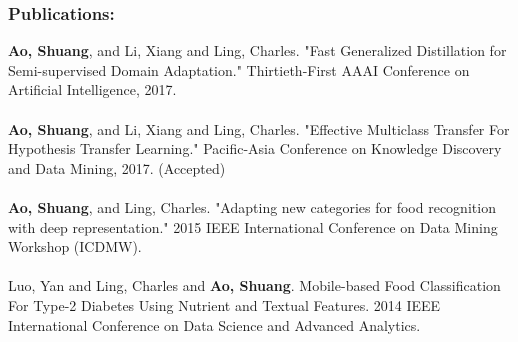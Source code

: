 \documentclass[12pt,twoside]{report}
\numberwithin{figure}{chapter}
\begin{document}
	\subsubsection*{Publications:}
	\textbf{Ao, Shuang}, and Li, Xiang and Ling, Charles. "Fast Generalized Distillation for Semi-supervised Domain Adaptation." Thirtieth-First AAAI Conference on Artificial Intelligence, 2017.\\\\
	\textbf{Ao, Shuang}, and Li, Xiang and Ling, Charles. "Effective Multiclass Transfer For Hypothesis Transfer Learning." Pacific-Asia Conference on Knowledge Discovery and Data Mining, 2017. (Accepted)\\\\
	\textbf{Ao, Shuang}, and Ling, Charles. "Adapting new categories for food recognition with deep representation." 2015 IEEE International Conference on Data Mining Workshop (ICDMW).\\\\
	Luo, Yan and Ling, Charles and \textbf{Ao, Shuang}. Mobile-based Food Classification For Type-2 Diabetes Using Nutrient and Textual Features. 2014 IEEE International Conference on Data Science and Advanced Analytics.
	
\end{document}
